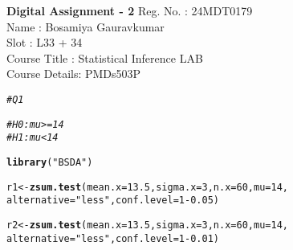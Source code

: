 \documentclass{article}\usepackage[]{graphicx}\usepackage[]{xcolor}
\makeatletter
\newcommand{\hlnum}[1]{\textcolor[rgb]{0.686,0.059,0.569}{#1}}%
\newcommand{\hlsng}[1]{\textcolor[rgb]{0.192,0.494,0.8}{#1}}%
\newcommand{\hlcom}[1]{\textcolor[rgb]{0.678,0.584,0.686}{\textit{#1}}}%
\newcommand{\hlopt}[1]{\textcolor[rgb]{0,0,0}{#1}}%
\newcommand{\hldef}[1]{\textcolor[rgb]{0.345,0.345,0.345}{#1}}%
\newcommand{\hlkwb}[1]{\textcolor[rgb]{0.69,0.353,0.396}{#1}}%
\newcommand{\hlkwc}[1]{\textcolor[rgb]{0.333,0.667,0.333}{#1}}%
\newcommand{\hlkwd}[1]{\textcolor[rgb]{0.737,0.353,0.396}{\textbf{#1}}}%
\newenvironment{kframe}{%
 \def\at@end@of@kframe{}%
 \ifinner\ifhmode%
  \def\at@end@of@kframe{\end{minipage}}%
  \begin{minipage}{\columnwidth}%
 \fi\fi%
 \def\FrameCommand##1{\hskip\@totalleftmargin \hskip-\fboxsep
 \colorbox{shadecolor}{##1}\hskip-\fboxsep
     \hskip-\linewidth \hskip-\@totalleftmargin \hskip\columnwidth}%
 \MakeFramed {\advance\hsize-\width
   \@totalleftmargin\z@ \linewidth\hsize
   \@setminipage}}%
 {\par\unskip\endMakeFramed%
 \at@end@of@kframe}
\newenvironment{knitrout}{}{} %
\makeatother
\begin{document}
\begin{center}
\textbf{\Large{Digital Assignment - 2}}
\newline
Reg. No. : 24MDT0179\\
Name : Bosamiya Gauravkumar \\
Slot : L33 + 34 \\
Course Title : Statistical Inference LAB\\
Course Details: PMDs503P \\

\end{center}

\begin{knitrout}
\color{fgcolor}\begin{kframe}
\begin{alltt}
\hlcom{#Q1 }

\hlcom{# H0 : mu >= 14}
\hlcom{# H1 : mu < 14}

\hlkwd{library}\hldef{(}\hlsng{"BSDA"}\hldef{)}
\end{alltt}


{\ttfamily\noindent\color{warningcolor}{\#\# Warning: package 'BSDA' was built under R version 4.4.2}}

{\ttfamily\noindent\itshape\color{messagecolor}{\#\# Loading required package: lattice}}

{\ttfamily\noindent\itshape\color{messagecolor}{\#\# \\\#\# Attaching package: 'BSDA'}}

{\ttfamily\noindent\itshape\color{messagecolor}{\#\# The following object is masked from 'package:datasets':\\\#\# \\\#\# \ \ \ \ Orange}}\begin{alltt}
\hldef{r1} \hlkwb{<-}\hlkwd{zsum.test}\hldef{(}\hlkwc{mean.x} \hldef{=} \hlnum{13.5}\hldef{,} \hlkwc{sigma.x} \hldef{=} \hlnum{3}\hldef{,} \hlkwc{n.x} \hldef{=} \hlnum{60}\hldef{,} \hlkwc{mu}\hldef{=}\hlnum{14}\hldef{,}
               \hlkwc{alternative}\hldef{=}\hlsng{"less"}\hldef{,} \hlkwc{conf.level} \hldef{=} \hlnum{1}\hlopt{-}\hlnum{0.05}\hldef{)}

\hldef{r2} \hlkwb{<-} \hlkwd{zsum.test}\hldef{(}\hlkwc{mean.x} \hldef{=} \hlnum{13.5}\hldef{,} \hlkwc{sigma.x} \hldef{=} \hlnum{3}\hldef{,} \hlkwc{n.x} \hldef{=} \hlnum{60}\hldef{,} \hlkwc{mu}\hldef{=}\hlnum{14}\hldef{,}
                \hlkwc{alternative}\hldef{=}\hlsng{"less"}\hldef{,} \hlkwc{conf.level} \hldef{=} \hlnum{1}\hlopt{-}\hlnum{0.01}\hldef{)}


\end{alltt}
\end{kframe}
\end{knitrout}
\end{document}

